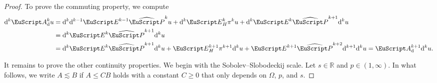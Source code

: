 \documentclass[10pt,a4paper]{amsart}
\theoremstyle{definition}
\theoremstyle{remark}
\numberwithin{equation}{section}
\newcommand{\bbR}{{\mathbb R}}
\newcommand{\euA}{{\EuScript A}}
\newcommand{\euE}{{\EuScript E}}
\newcommand{\euP}{{\EuScript P}}
\newcommand{\cartan}{{\mathrm d}}
\newcommand{\Domain}{{\Omega}}
\newcommand{\Proj}{\pi}
\newcommand{\Poincare}{\euP}
\newcommand{\Extension}{\euE}
\newcommand{\kommErweiterung}{\euA_{\cartan}}
\begin{document}
\begin{proof}
    To prove the commuting property, we compute
    \begin{align*}
        \cartan^{k} \kommErweiterung^{k} u
        &
        =
        \cartan^{k} \cartan^{k-1} \Extension^{k-1} \widehat\Poincare^{k} u 
        +   
        \cartan^{k} \Extension_{H}^{k} \Proj^{k} u
        +
        \cartan^{k} \Extension^{k} \widehat\Poincare^{k+1} \cartan^{k} u
        \\&
        =
        \cartan^{k} \Extension^{k} \widehat\Poincare^{k+1} \cartan^{k} u
        \\&
        =
        \cartan^{k} \Extension^{k} \widehat\Poincare^{k+1} \cartan^{k} u
        +   
        \Extension_{H}^{k+1} \Proj^{k+1} \cartan^{k} u
        +
        \Extension^{k+1} \widehat\Poincare^{k+2} \cartan^{k+1} \cartan^{k} u
        =
        \kommErweiterung^{k+1} \cartan^{k} u
        .
    \end{align*}    



    It remains to prove the other continuity properties. 
    We begin with the Sobolev--Slobodeckij scale. 
    Let $s \in \bbR$ and $p \in (1,\infty)$.
    In what follows, we write $A \lesssim B$ if $A \leq C B$ holds with a constant $C \geq 0$
    that only depends on $\Domain$, $p$, and $s$. 
    

\end{proof}
\end{document}
